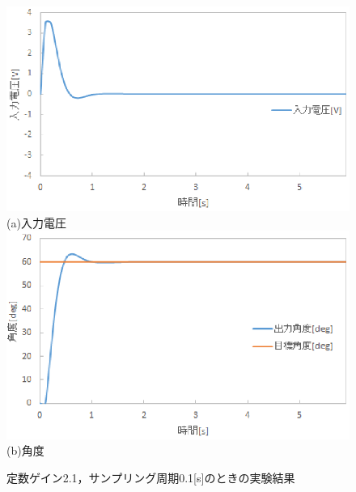 \documentclass[11pt,a4paper]{jsarticle}
\begin{document}
\begin{figure}[H]
 \begin{center}
  \includegraphics[scale=.6]{./picture/graph9.eps} \\
  (a)入力電圧 \\
  \includegraphics[scale=.6]{./picture/graph10.eps} \\
  (b)角度
  \caption{定数ゲイン2.1，サンプリング周期0.1[s]のときの実験結果}
  \label{fig7}
 \end{center}
\end{figure}
\end{document}
